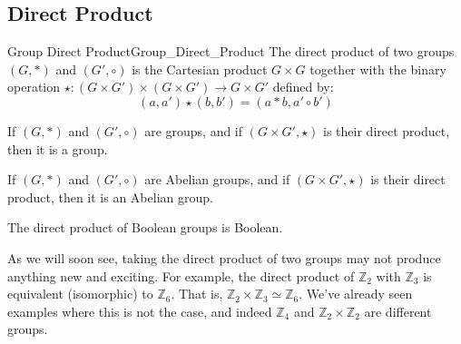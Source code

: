     \subsection{Direct Product}
        \begin{fdefinition}{Group Direct Product}{Group_Direct_Product}
            The direct product of two groups $(G,*)$ and $(G',\circ)$ is the
            Cartesian product $G\times{G}$ together with the binary operation
            $\star:(G\times{G}')\times(G\times{G}')\rightarrow{G}\times{G}'$
            defined by:
            \begin{equation*}
                (a,a')\star(b,b')=(a*b,a'\circ{b}')
            \end{equation*}
        \end{fdefinition}
        \begin{theorem}
            If $(G,*)$ and $(G',\circ)$ are groups, and if $(G\times{G}',\star)$
            is their direct product, then it is a group.
        \end{theorem}
        \begin{theorem}
            If $(G,*)$ and $(G',\circ)$ are Abelian groups, and if
            $(G\times{G}',\star)$ is their direct product, then it is an Abelian
            group.
        \end{theorem}
        \begin{theorem}
            The direct product of Boolean groups is Boolean.
        \end{theorem}
        \begin{example}
            As we will soon see, taking the direct product of two groups may not
            produce anything new and exciting. For example, the direct product
            of $\mathbb{Z}_{2}$ with $\mathbb{Z}_{3}$ is equivalent (isomorphic)
            to $\mathbb{Z}_{6}$. That is,
            $\mathbb{Z}_{2}\times\mathbb{Z}_{3}\simeq\mathbb{Z}_{6}$. We've
            already seen examples where this is not the case, and indeed
            $\mathbb{Z}_{4}$ and $\mathbb{Z}_{2}\times\mathbb{Z}_{2}$ are
            different groups.
        \end{example}
